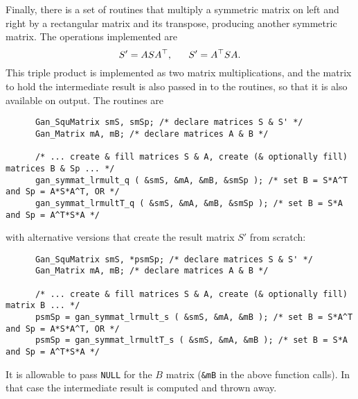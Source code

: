 Finally, there is a set of routines that multiply a symmetric matrix on left
and right by a rectangular matrix and its transpose, producing another
symmetric matrix. The operations implemented are
\[ S' = A S A^{\top},\;\;\;\;\;\;S' = A^{\top} S A.
\]
This triple product is implemented as two matrix multiplications, and the
matrix to hold the intermediate result is also passed in to the routines,
so that it is also available on output. The routines are
\begin{verbatim}
      Gan_SquMatrix smS, smSp; /* declare matrices S & S' */
      Gan_Matrix mA, mB; /* declare matrices A & B */

      /* ... create & fill matrices S & A, create (& optionally fill) matrices B & Sp ... */
      gan_symmat_lrmult_q ( &smS, &mA, &mB, &smSp ); /* set B = S*A^T and Sp = A*S*A^T, OR */
      gan_symmat_lrmultT_q ( &smS, &mA, &mB, &smSp ); /* set B = S*A and Sp = A^T*S*A */
\end{verbatim}
with alternative versions that create the result matrix $S'$ from scratch:
\begin{verbatim}
      Gan_SquMatrix smS, *psmSp; /* declare matrices S & S' */
      Gan_Matrix mA, mB; /* declare matrices A & B */

      /* ... create & fill matrices S & A, create (& optionally fill) matrix B ... */
      psmSp = gan_symmat_lrmult_s ( &smS, &mA, &mB ); /* set B = S*A^T and Sp = A*S*A^T, OR */
      psmSp = gan_symmat_lrmultT_s ( &smS, &mA, &mB ); /* set B = S*A and Sp = A^T*S*A */
\end{verbatim}
It is allowable to pass {\tt NULL} for the $B$ matrix ({\tt \&mB} in the
above function calls). In that case the intermediate result is computed and
thrown away.


